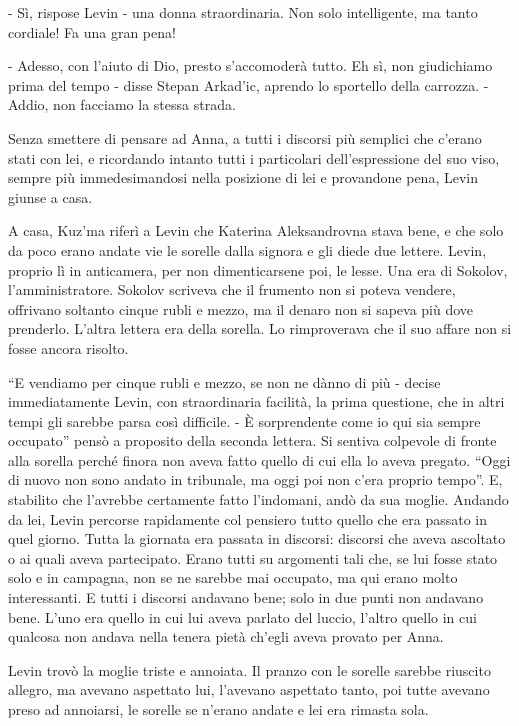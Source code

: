 - Sì, rispose Levin - una donna straordinaria. Non solo intelligente, ma tanto cordiale! Fa una gran pena! 

- Adesso, con l'aiuto di Dio, presto s'accomoderà tutto. Eh sì, non giudichiamo prima del tempo - disse Stepan Arkad'ic, aprendo lo sportello della carrozza. - Addio, non facciamo la stessa strada. 

Senza smettere di pensare ad Anna, a tutti i discorsi più semplici che c'erano stati con lei, e ricordando intanto tutti i particolari dell'espressione del suo viso, sempre più immedesimandosi nella posizione di lei e provandone pena, Levin giunse a casa. 

A casa, Kuz'ma riferì a Levin che Katerina Aleksandrovna stava bene, e che solo da poco erano andate vie le sorelle dalla signora e gli diede due lettere. Levin, proprio lì in anticamera, per non dimenticarsene poi, le lesse. Una era di Sokolov, l'amministratore. Sokolov scriveva che il frumento non si poteva vendere, offrivano soltanto cinque rubli e mezzo, ma il denaro non si sapeva più dove prenderlo. L'altra lettera era della sorella. Lo rimproverava che il suo affare non si fosse ancora risolto. 

``E vendiamo per cinque rubli e mezzo, se non ne dànno di più - decise immediatamente Levin, con straordinaria facilità, la prima questione, che in altri tempi gli sarebbe parsa così difficile. - È sorprendente come io qui sia sempre occupato'' pensò a proposito della seconda lettera. Si sentiva colpevole di fronte alla sorella perché finora non aveva fatto quello di cui ella lo aveva pregato. ``Oggi di nuovo non sono andato in tribunale, ma oggi poi non c'era proprio tempo''. E, stabilito che l'avrebbe certamente fatto l'indomani, andò da sua moglie. Andando da lei, Levin percorse rapidamente col pensiero tutto quello che era passato in quel giorno. Tutta la giornata era passata in discorsi: discorsi che aveva ascoltato o ai quali aveva partecipato. Erano tutti su argomenti tali che, se lui fosse stato solo e in campagna, non se ne sarebbe mai occupato, ma qui erano molto interessanti. E tutti i discorsi andavano bene; solo in due punti non andavano bene. L'uno era quello in cui lui aveva parlato del luccio, l'altro quello in cui qualcosa non andava nella tenera pietà ch'egli aveva provato per Anna. 

Levin trovò la moglie triste e annoiata. Il pranzo con le sorelle sarebbe riuscito allegro, ma avevano aspettato lui, l'avevano aspettato tanto, poi tutte avevano preso ad annoiarsi, le sorelle se n'erano andate e lei era rimasta sola. 

